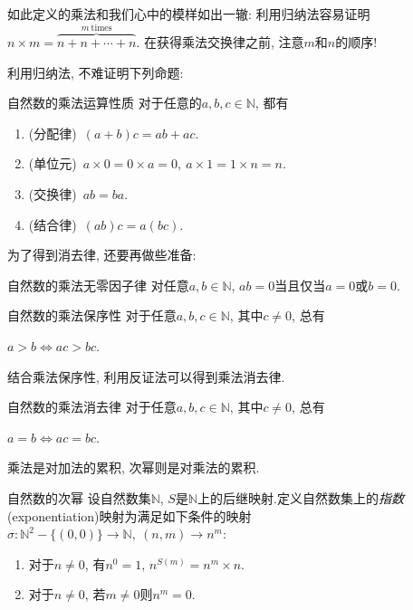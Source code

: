 如此定义的乘法和我们心中的模样如出一辙: 利用归纳法容易证明$n \times m = \overbrace{n+n+\cdots +n}^{m~ \text{times}}$. 在获得乘法交换律之前, 注意$m$和$n$的顺序! 

利用归纳法, 不难证明下列命题: 

\begin{proposition}{自然数的乘法运算性质}
	对于任意的$a, b, c \in \mathbb{N}$, 都有
	\begin{enumerate}
		\item (分配律)~$(a+b)c = ab+ac$.
		\item (单位元)~$a \times 0 = 0 \times a = 0, ~a \times 1 = 1 \times n = n$.
		\item (交换律)~$ab=ba$.
		\item (结合律)~$(ab)c=a(bc)$.
	\end{enumerate}
\end{proposition}

为了得到消去律, 还要再做些准备: 

\begin{proposition}{自然数的乘法无零因子律}
	对任意$a, b \in \mathbb{N}$, $ab=0$当且仅当$a=0$或$b=0$.
\end{proposition}

\begin{proposition}{自然数的乘法保序性}
	对于任意$a, b, c \in \mathbb{N}$, 其中$c \neq 0$, 总有
	\begin{center}
		$a>b \Leftrightarrow ac>bc.$
	\end{center}
\end{proposition}

结合乘法保序性, 利用反证法可以得到乘法消去律.

\begin{corollary}{自然数的乘法消去律}
	对于任意$a, b, c \in \mathbb{N}$, 其中$c \neq 0$, 总有
	\begin{center}
		$a=b \Leftrightarrow ac=bc.$
	\end{center}
\end{corollary}

乘法是对加法的累积, 次幂则是对乘法的累积.

\begin{definition}{自然数的次幂}
	设自然数集$\mathbb{N}$, $S$是$\mathbb{N}$上的后继映射.定义自然数集上的\textit{指数}(exponentiation)映射为满足如下条件的映射$\sigma : \mathbb{N}^2-\{ (0, 0) \} \to \mathbb{N}, ~(n, m) \to n^m$: 
	\begin{enumerate}
		\item 对于$n \neq 0$, 有$n^0=1$, $n^{S(m)}=n^m \times n$.
		\item 对于$n \neq 0$, 若$m \neq 0$则$n^m=0$.
	\end{enumerate}
\end{definition}

